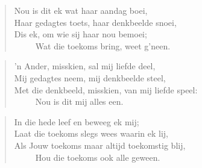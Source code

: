 \begin{verse}
Nou is dit ek wat haar aandag boei, \\ 
Haar gedagtes toets, haar denkbeelde snoei, \\ 
Dis ek, om wie sij haar nou bemoei; \\ 
\ \ \ \ \ Wat die toekoms bring, weet g’neen. \\ 
\end{verse}

\begin{verse}
’n Ander, misskien, sal mij liefde deel, \\ 
Mij gedagtes neem, mij denkbeelde steel, \\ 
Met die denkbeeld, misskien, van mij liefde speel: \\ 
\ \ \ \ \ Nou is dit mij alles een. \\ 
\end{verse}

\begin{verse}
In die hede leef en beweeg ek mij; \\ 
Laat die toekoms slegs wees waarin ek lij, \\ 
Als Jouw toekoms maar altijd toekomstig blij, \\ 
\ \ \ \ \ Hou die toekoms ook alle geween. \\ 
\end{verse}